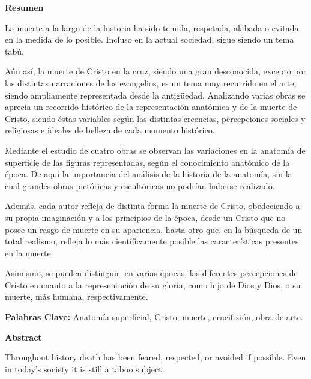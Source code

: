 \textbf{Resumen}

La muerte a la largo de la historia ha sido temida, respetada, alabada o evitada en la medida de lo posible. Incluso en la actual sociedad, %
sigue siendo un tema tabú.

Aún así, la muerte de Cristo en la cruz, siendo una gran desconocida, excepto por las distintas narraciones de los evangelios, es un tema muy recurrido en el arte, siendo ampliamente representada desde la antigüedad. Analizando varias obras se aprecia un recorrido histórico de la representación anatómica y de la muerte de Cristo, siendo éstas variables según las distintas creencias, percepciones sociales y religiosas e ideales de belleza de cada momento histórico.

Mediante el estudio de cuatro obras se observan las variaciones en la anatomía de superficie de las figuras representadas, según el conocimiento anatómico de la época. %
De aquí la importancia del análisis de la historia de la anatomía, sin la cual grandes obras pictóricas y escultóricas no podrían haberse realizado.

Además, cada autor refleja de distinta forma la muerte de Cristo, obedeciendo a su propia imaginación y a los principios de la época, desde un Cristo que no posee un rasgo de muerte en su apariencia, hasta otro que, en la búsqueda de un total realismo, refleja lo más científicamente posible %
las características presentes en la muerte. %


Asimismo, se pueden distinguir, en varias épocas, las diferentes percepciones de Cristo en cuanto a la representación de su gloria, como hijo de Dios y Dios, o su muerte, más humana, respectivamente.


\textbf{Palabras Clave:}
Anatomía superficial, Cristo, muerte, crucifixión, obra de arte.

\vspace{10pt}

\textbf{Abstract}

Throughout history death has been feared, respected, or avoided if possible. Even in today's society it is still a taboo subject.

